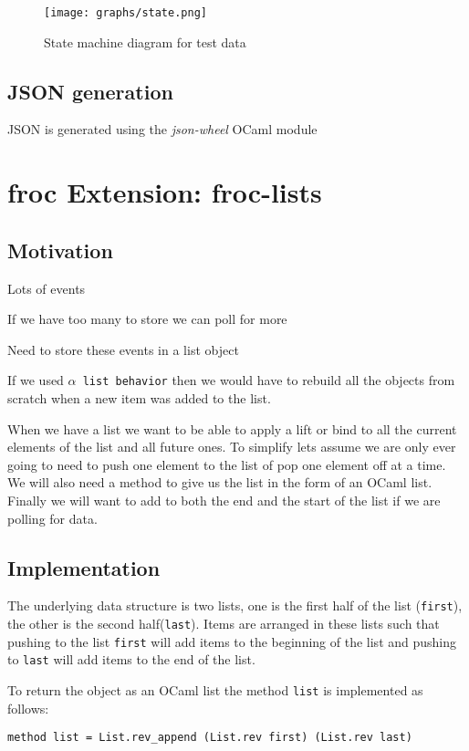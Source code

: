 \begin{figure}
  \centering
  \texttt{[image: graphs/state.png]}
  \caption{State machine diagram for test data}
  \label{state}
\end{figure}

\subsection{JSON generation}
JSON is generated using the \emph{json-wheel} OCaml module

\section{froc Extension: froc-lists}
\subsection{Motivation}
Lots of events

If we have too many to store we can poll for more

Need to store these events in a list object

If we used \texttt{\textnormal{$\alpha$} list behavior} then we would have to rebuild all the objects from scratch when a new item was added to the list.

When we have a list we want to be able to apply a lift or bind to all the current elements of the list and all future ones. To simplify lets assume we are only ever going to need to push one element to the list of pop one element off at a time. We will also need a method to give us the list in the form of an OCaml list. Finally we will want to add to both the end and the start of the list if we are polling for data.

\subsection{Implementation}

The underlying data structure is two lists, one is the first half of the list (\texttt{first}), the other is the second half(\texttt{last}). Items are arranged in these lists such that pushing to the list \texttt{first} will add items to the beginning of the list and pushing to \texttt{last} will add items to the end of the list.

To return the object as an OCaml list the method \texttt{list} is implemented as follows:

\texttt{method list = List.rev\_append (List.rev first) (List.rev last)}


